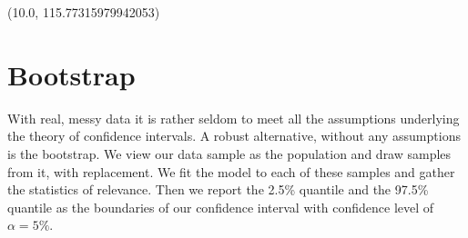 \documentclass[letterpaper,10pt,english]{jupyterBook}
\begin{document}
\begin{sphinxVerbatim}[commandchars=\\\{\}]
(\PYGZhy{}10.0, 115.77315979942053)
\end{sphinxVerbatim}

\noindent{}


\section{Bootstrap}
\label{\detokenize{Regression_Techniques:bootstrap}}
\sphinxAtStartPar
With real, messy data it is rather seldom to meet all the assumptions underlying the theory of confidence intervals. A robust alternative, without any assumptions is the bootstrap. We view our data sample as the population and draw samples from it, with replacement. We fit the model to each of these samples and gather the statistics of relevance. Then we report the 2.5\% quantile and the 97.5\% quantile as the boundaries of our confidence interval with confidence level of \(\alpha=5\%\).
\end{document}
